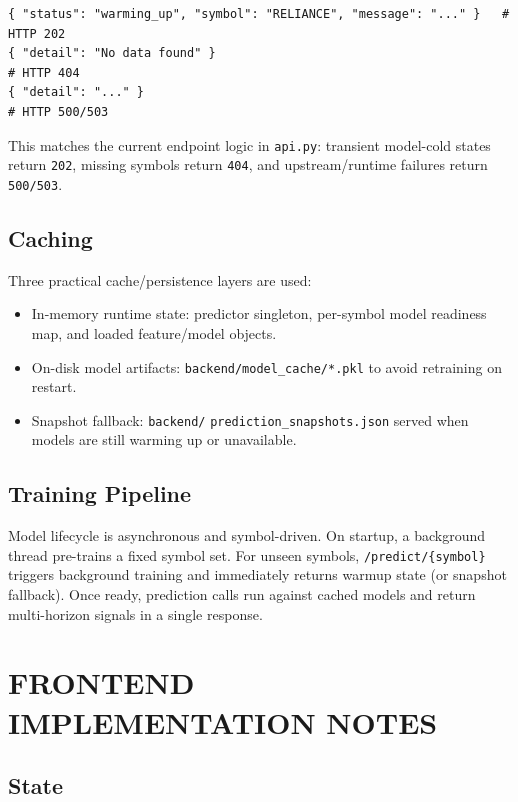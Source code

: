 \documentclass[12pt,a4paper]{report}
\numberwithin{equation}{chapter}
\begin{document}
\begin{lstlisting}[breaklines=true]
{ "status": "warming_up", "symbol": "RELIANCE", "message": "..." }   # HTTP 202
{ "detail": "No data found" }                                                # HTTP 404
{ "detail": "..." }                                                          # HTTP 500/503
\end{lstlisting}

This matches the current endpoint logic in \texttt{api.py}: transient model-cold states return \texttt{202}, missing symbols return \texttt{404}, and upstream/runtime failures return \texttt{500/503}.

\subsection{Caching}

Three practical cache/persistence layers are used:

\begin{itemize}
  \item In-memory runtime state: predictor singleton, per-symbol model readiness map, and loaded feature/model objects.
  \item On-disk model artifacts: \texttt{backend/model\_cache/*.pkl} to avoid retraining on restart.
  \item Snapshot fallback: \texttt{backend/} \texttt{prediction\_snapshots.json} served when models are still warming up or unavailable.
\end{itemize}

\subsection{Training Pipeline}

Model lifecycle is asynchronous and symbol-driven. On startup, a background thread pre-trains a fixed symbol set. For unseen symbols, \texttt{/predict/\{symbol\}} triggers background training and immediately returns warmup state (or snapshot fallback). Once ready, prediction calls run against cached models and return multi-horizon signals in a single response.

\section{FRONTEND IMPLEMENTATION NOTES}

\subsection{State}
\end{document}
